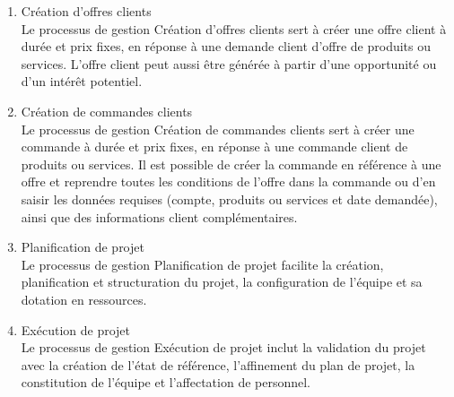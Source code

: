 \begin{enumerate}
\item Création d’offres clients \\
Le processus de gestion Création d'offres clients sert à créer une offre client à durée et prix fixes, en réponse à une demande client d'offre de  produits ou services. L'offre client peut aussi être générée à partir d'une opportunité ou d'un intérêt potentiel. \\

\item Création de commandes clients \\
Le processus de gestion Création de commandes clients sert à créer une commande à durée et prix fixes, en réponse à une commande client de produits ou services. Il est possible de créer la commande en référence à une offre et reprendre toutes les conditions de l'offre dans la commande ou d’en saisir les données requises (compte, produits ou services et date
demandée), ainsi que des informations client complémentaires. \\

\item Planification de projet \\
Le processus de gestion Planification de projet facilite la création, planification et structuration du projet, la configuration de l'équipe et sa dotation en ressources. \\

\item Exécution de projet \\
Le processus de gestion Exécution de projet inclut la validation du projet avec la création de l'état de référence, l'affinement du plan de projet, la constitution de l'équipe et l'affectation de personnel.
\end{enumerate}


